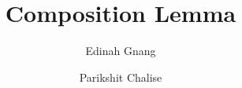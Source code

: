 \documentclass{amsbook}
\title{Composition Lemma}
\author{Edinah Gnang}
\author{Parikshit Chalise}
\begin{document}
\linenumbers
\maketitle
\tableofcontents





\end{document}
